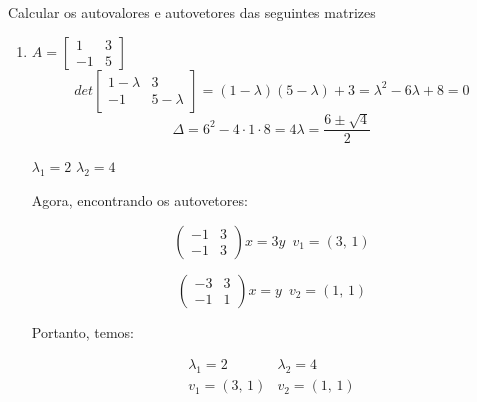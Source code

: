 \item Calcular os autovalores e autovetores das
seguintes matrizes

\begin{enumerate}
	\item 
	$A = 
	\begin{bmatrix}
		 1 & 3 \\
		-1 & 5
	\end{bmatrix}		
	$
	\pagebreak
	\solucao
	$$det
	\begin{bmatrix}
		 1 - \lambda & 3 \\
		-1           & 5 - \lambda
	\end{bmatrix}
	=
	(1 - \lambda)(5-\lambda) + 3	
	=
	\lambda^2 - 6\lambda+8 = 0	
	$$
	$$
	\Delta = 6^2 - 4\cdot 1 \cdot 8 = 4
	\lambda = \frac{6 \pm \sqrt{4}}{2}
	$$
	\begin{center}
	$\lambda_1 = 2$
	$\lambda_2 = 4$	
	\end{center}
	Agora, encontrando os autovetores:
	
	$$
	\begin{pmatrix}
		-1 & 3 \\
		-1 & 3
	\end{pmatrix}
	x = 3y
	\, \, \, 
	v_1 = (3, \, 1)
	$$
	
	$$
	\begin{pmatrix}
		-3 & 3 \\
		-1 & 1
	\end{pmatrix}
	x = y
	\, \, \, 
	v_2 = (1, \, 1)
	$$
	
	Portanto, temos:
	
	$$
	\begin{array}{cc}
		\lambda_1 = 2 & \lambda_2 = 4 \\
		v_1 = (3, \, 1) & v_2 = (1, \, 1)
	\end{array}		
	$$
	

\end{enumerate}
